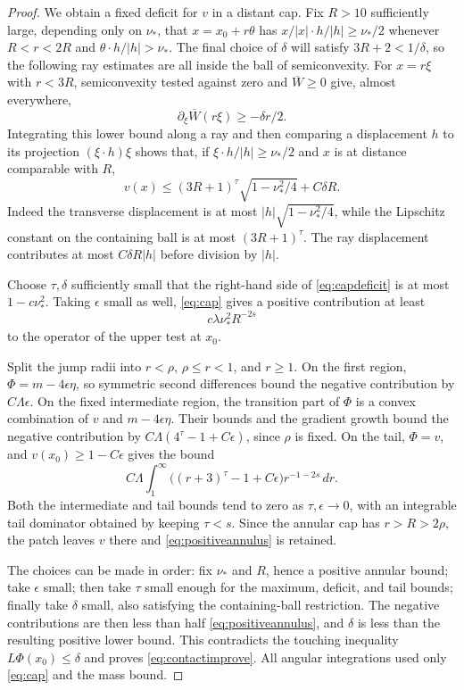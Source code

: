 \documentclass[11pt]{article}
\numberwithin{equation}{section}
\theoremstyle{remark}
\newcommand{\abs}[1]{\lvert #1\rvert}
\newcommand{\dd}{\,d}
\begin{document}
\begin{proof}
We obtain a fixed deficit for $v$ in a distant cap. Fix $R>10$ sufficiently large, depending only on $\nu_*$, that $x=x_0+r\theta$ has $x/\abs x\cdot h/\abs h\ge\nu_*/2$ whenever $R<r<2R$ and $\theta\cdot h/\abs h>\nu_*$. The final choice of $\delta$ will satisfy $3R+2<1/\delta$, so the following ray estimates are all inside the ball of semiconvexity. For $x=r\xi$ with $r<3R$, semiconvexity tested against zero and $\overline W\ge0$ give, almost everywhere,
\[
 \partial_\xi\overline W(r\xi)\ge-\delta r/2.
\]
Integrating this lower bound along a ray and then comparing a displacement $h$ to its projection $(\xi\cdot h)\xi$ shows that, if $\xi\cdot h/\abs h\ge\nu_*/2$ and $x$ is at distance comparable with $R$,
\begin{equation}\label{eq:capdeficit}
 v(x)\le(3R+1)^\tau\sqrt{1-\nu_*^2/4}+C\delta R.
\end{equation}
Indeed the transverse displacement is at most $\abs h\sqrt{1-\nu_*^2/4}$, while the Lipschitz constant on the containing ball is at most $(3R+1)^\tau$. The ray displacement contributes at most $C\delta R\abs h$ before division by $\abs h$.

Choose $\tau,\delta$ sufficiently small that the right-hand side of \eqref{eq:capdeficit} is at most $1-c\nu_*^2$. Taking $\epsilon$ small as well, \eqref{eq:cap} gives a positive contribution at least
\begin{equation}\label{eq:positiveannulus}
 c\lambda\nu_*^2R^{-2s}
\end{equation}
to the operator of the upper test at $x_0$.

Split the jump radii into $r<\rho$, $\rho\le r<1$, and $r\ge1$. On the first region, $\Phi=m-4\epsilon\eta$, so symmetric second differences bound the negative contribution by $C\Lambda\epsilon$. On the fixed intermediate region, the transition part of $\Phi$ is a convex combination of $v$ and $m-4\epsilon\eta$. Their bounds and the gradient growth bound the negative contribution by $C\Lambda(4^\tau-1+C\epsilon)$, since $\rho$ is fixed. On the tail, $\Phi=v$, and $v(x_0)\ge1-C\epsilon$ gives the bound
\begin{equation}\label{eq:negativetail}
 C\Lambda\int_1^\infty\bigl((r+3)^\tau-1+C\epsilon\bigr)
 r^{-1-2s}\dd r.
\end{equation}
Both the intermediate and tail bounds tend to zero as $\tau,\epsilon\to0$, with an integrable tail dominator obtained by keeping $\tau<s$. Since the annular cap has $r>R>2\rho$, the patch leaves $v$ there and \eqref{eq:positiveannulus} is retained.

The choices can be made in order: fix $\nu_*$ and $R$, hence a positive annular bound; take $\epsilon$ small; then take $\tau$ small enough for the maximum, deficit, and tail bounds; finally take $\delta$ small, also satisfying the containing-ball restriction. The negative contributions are then less than half \eqref{eq:positiveannulus}, and $\delta$ is less than the resulting positive lower bound. This contradicts the touching inequality $L\Phi(x_0)\le\delta$ and proves \eqref{eq:contactimprove}. All angular integrations used only \eqref{eq:cap} and the mass bound.
\end{proof}
\end{document}
